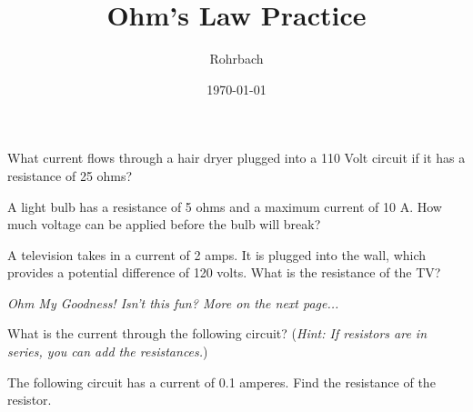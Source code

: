 \documentclass[10pt]{exam}
\title{Ohm's Law Practice}
\author{Rohrbach}
\date{\today}
\begin{document}
\maketitle

\begin{questions}
  
  \question
    What current flows through a hair dryer plugged into a 110 Volt circuit if it has a resistance of 25 ohms?
    \ku\vs

  \question
    A light bulb has a resistance of 5 ohms and a maximum current of 10 A. How much voltage can be applied before the bulb will break?
    \ku\vs

  \question
    A television takes in a current of 2 amps.  It is plugged into the wall, which provides a potential difference of 120 volts.  What is the resistance of the TV?
    \ku\vs

\begin{EnvUplevel}
  \begin{flushright}
    \emph{Ohm My Goodness! Isn't this fun?  More on the next page...}
  \end{flushright}
\end{EnvUplevel}

\pagebreak

\question
  What is the current through the following circuit?  (\emph{Hint: If resistors are in series, you can add the resistances.})
  

\question
  The following circuit has a current of 0.1 amperes.  Find the resistance of the resistor.
  
\end{questions}
\end{document}

